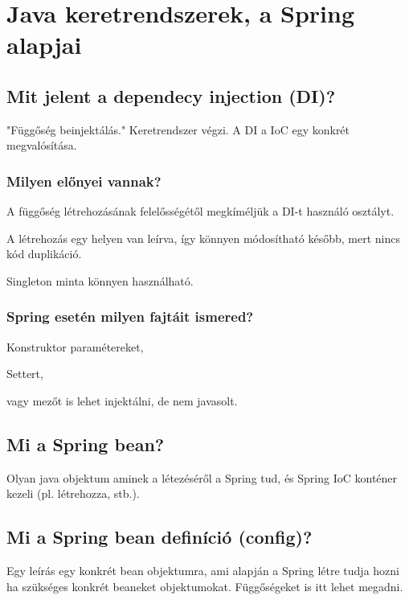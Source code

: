 \documentclass[a4paper,14pt]{extarticle}
\begin{document}
	\section{Java keretrendszerek, a Spring alapjai}
		\subsection{Mit jelent a dependecy injection (DI)?}
		\label{di}
			"Függőség beinjektálás." Keretrendszer végzi. A DI a IoC egy konkrét megvalósítása.
			\subsubsection{Milyen előnyei vannak?}
				\begin{compactitem}
					\item A függőség létrehozásának felelősségétől megkíméljük a DI-t használó osztályt.
					\item A létrehozás egy helyen van leírva, így könnyen módosítható később, mert nincs kód duplikáció.
					\item Singleton minta könnyen használható.
				\end{compactitem}
			\subsubsection{Spring esetén milyen fajtáit ismered?}
			\begin{compactitem}
				\item Konstruktor paramétereket,
				\item Settert,
				\item vagy mezőt is lehet injektálni, de nem javasolt.
			\end{compactitem}

		\subsection{Mi a Spring bean?}
			Olyan java objektum aminek a létezéséről a  Spring tud, és Spring IoC konténer kezeli (pl. létrehozza, stb.).  
		\subsection{Mi a Spring bean definíció (config)?}
		Egy leírás egy konkrét bean objektumra, ami alapján a Spring létre tudja hozni ha szükséges konkrét beaneket objektumokat.
		Függőségeket is itt lehet megadni.
\end{document}
